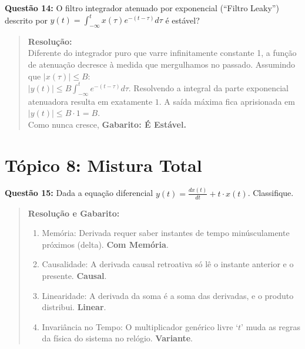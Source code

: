 \textbf{Questão 14:} O filtro integrador atenuado por exponencial (``Filtro Leaky'') descrito por \(y(t) = \int_{-\infty}^{t} x(\tau) e^{-(t-\tau)} d\tau\) é estável?

\begin{quote}
\textbf{Resolução:}\\
Diferente do integrador puro que varre infinitamente constante 1, a função de atenuação decresce à medida que mergulhamos no passado. Assumindo que \(|x(\tau)| \le B\):\\
\(|y(t)| \le B \int_{-\infty}^{t} e^{-(t-\tau)} d\tau\). Resolvendo a integral da parte exponencial atenuadora resulta em exatamente \(1\). A saída máxima fica aprisionada em \(|y(t)| \le B \cdot 1 = B\).\\
Como nunca cresce, \textbf{Gabarito: É Estável.}
\end{quote}

\section{Tópico 8: Mistura Total}\label{tuxf3pico-8-mistura-total}

\textbf{Questão 15:} Dada a equação diferencial \(y(t) = \frac{dx(t)}{dt} + t \cdot x(t)\). Classifique.

\begin{quote}
\textbf{Resolução e Gabarito:}

\begin{enumerate}
\def\labelenumi{\arabic{enumi}.}
\tightlist
\item
  Memória: Derivada requer saber instantes de tempo minúsculamente próximos (delta). \textbf{Com Memória}.
\item
  Causalidade: A derivada causal retroativa só lê o instante anterior e o presente. \textbf{Causal}.
\item
  Linearidade: A derivada da soma é a soma das derivadas, e o produto distribui. \textbf{Linear}.
\item
  Invariância no Tempo: O multiplicador genérico livre `\(t\)' muda as regras da física do sistema no relógio. \textbf{Variante}.
\end{enumerate}
\end{quote}

